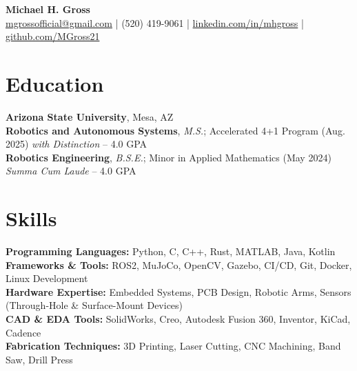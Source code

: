 \documentclass[10pt]{article}
\begin{document}
\begin{center}
    {\LARGE \textbf{Michael H. Gross}} \\
    \href{mailto:mgrossofficial@gmail.com}{mgrossofficial@gmail.com} | (520) 419-9061 | 
    \href{https://www.linkedin.com/in/mhgross}{linkedin.com/in/mhgross} | \href{https://github.com/MGross21}{github.com/MGross21}
\end{center}

\section*{Education}
\textbf{Arizona State University}, Mesa, AZ \\
\textbf{Robotics and Autonomous Systems}, \textit{M.S.}; Accelerated 4+1 Program (Aug. 2025) \hfill \textit{with Distinction} -- 4.0 GPA \\
\textbf{Robotics Engineering}, \textit{B.S.E.}; Minor in Applied Mathematics (May 2024) \hfill \textit{Summa Cum Laude} -- 4.0 GPA

\section*{Skills}
\textbf{Programming Languages:} Python, C, C++, Rust, MATLAB, Java, Kotlin \\
\textbf{Frameworks \& Tools:} ROS2, MuJoCo, OpenCV, Gazebo, CI/CD, Git, Docker, Linux Development \\
\textbf{Hardware Expertise:} Embedded Systems, PCB Design, Robotic Arms, Sensors (Through-Hole \& Surface-Mount Devices)\\
\textbf{CAD \& EDA Tools:} SolidWorks, Creo, Autodesk Fusion 360, Inventor, KiCad, Cadence \\
\textbf{Fabrication Techniques:} 3D Printing, Laser Cutting, CNC Machining, Band Saw, Drill Press
\end{document}
